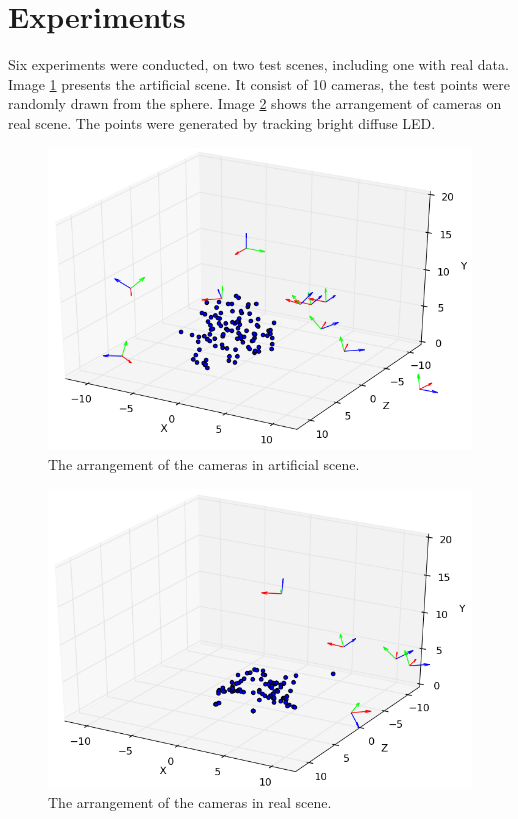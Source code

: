 \documentclass[12pt]{article}
\begin{document}
\section{Experiments}

Six experiments were conducted, on two test scenes, including one with real
data. Image  \ref{fig:artificial} presents the artificial scene. It consist of
10 cameras, the test points  were randomly drawn from the sphere. Image
\ref{fig:real} shows the arrangement of cameras on  real scene. The points were
generated by tracking bright diffuse LED.

\begin{figure}[ht]
\centering
\includegraphics[scale=0.5]{artificial.png}
\caption{The arrangement of the cameras in artificial scene.}
\label{fig:artificial}
\end{figure}

\begin{figure}[ht]
\centering
\includegraphics[scale=0.5]{real.png}
\caption{The arrangement of the cameras in real scene.}
\label{fig:real}
\end{figure}
\end{document}
